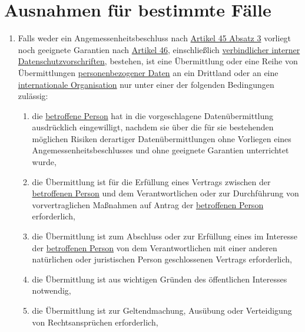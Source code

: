 \chapter{Ausnahmen für bestimmte Fälle}
\label{ch:49}


\begin{enumerate}

  \item Falls weder ein Angemessenheitsbeschluss nach \hyperref[itm:45-3]{Artikel 45 Absatz 3} vorliegt noch geeignete
   Garantien nach \hyperref[ch:46]{Artikel 46}, einschließlich \hyperref[itm:04-20]{verbindlicher interner Datenschutzvorschriften},
   bestehen, ist eine Übermittlung oder eine Reihe von Übermittlungen \hyperref[itm:04-1]{personenbezogener Daten} an ein Drittland oder an
   eine \hyperref[itm:04-29]{internationale Organisation} nur unter einer der folgenden Bedingungen zulässig:
  \label{itm:49-1-1}

  \begin{enumerate}
  
    \item die \hyperref[itm:04-1]{betroffene Person} hat in die vorgeschlagene Datenübermittlung ausdrücklich eingewilligt, nachdem sie über
     die für sie bestehenden möglichen Risiken derartiger Datenübermittlungen ohne Vorliegen eines
     Angemessenheitsbeschlusses und ohne geeignete Garantien unterrichtet wurde,
    \label{itm:49-1-1a}

    \item die Übermittlung ist für die Erfüllung eines Vertrags zwischen der \hyperref[itm:04-1]{betroffenen Person} und dem Verantwortlichen
     oder zur Durchführung von vorvertraglichen Maßnahmen auf Antrag der \hyperref[itm:04-1]{betroffenen Person} erforderlich,
    \label{itm:49-1-1b}

    \item die Übermittlung ist zum Abschluss oder zur Erfüllung eines im Interesse der \hyperref[itm:04-1]{betroffenen Person} von dem
     Verantwortlichen mit einer anderen natürlichen oder juristischen Person geschlossenen Vertrags erforderlich,
    \label{itm:49-1-1c}

    \item die Übermittlung ist aus wichtigen Gründen des öffentlichen Interesses notwendig,
    \label{itm:49-1-1d}

    \item die Übermittlung ist zur Geltendmachung, Ausübung oder Verteidigung von Rechtsansprüchen erforderlich,
    \label{itm:49-1-1e}


\end{enumerate}
\end{enumerate}
